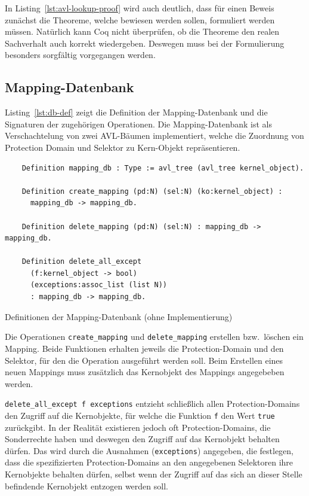 \documentclass[a4paper, parskip]{scrartcl}
\begin{document}
In Listing~\ref{lst:avl-lookup-proof} wird auch deutlich, dass für einen Beweis zunächst die Theoreme, welche bewiesen werden sollen, formuliert werden müssen.
Natürlich kann Coq nicht überprüfen, ob die Theoreme den realen Sachverhalt auch korrekt wiedergeben.
Deswegen muss bei der Formulierung besonders sorgfältig vorgegangen werden.

\subsection{Mapping-Datenbank}
Listing~\ref{lst:db-def} zeigt die Definition der Mapping-Datenbank und die Signaturen der zugehörigen Operationen. 
Die Mapping-Datenbank ist als Verschachtelung von zwei AVL-Bäumen implementiert, welche die Zuordnung von Protection Domain und Selektor zu Kern-Objekt repräsentieren.
\begin{listing}
  \begin{verbatim}
    Definition mapping_db : Type := avl_tree (avl_tree kernel_object).

    Definition create_mapping (pd:N) (sel:N) (ko:kernel_object) : 
      mapping_db -> mapping_db.

    Definition delete_mapping (pd:N) (sel:N) : mapping_db -> mapping_db.

    Definition delete_all_except
      (f:kernel_object -> bool)
      (exceptions:assoc_list (list N))
      : mapping_db -> mapping_db.
  \end{verbatim}
  \caption{Definitionen der Mapping-Datenbank (ohne Implementierung)}
  \label{lst:db-def}
\end{listing}

Die Operationen \verb|create_mapping| und \verb|delete_mapping| erstellen bzw.\ löschen ein Mapping. Beide Funktionen erhalten jeweils die Protection-Domain und den Selektor, für den die Operation ausgeführt werden soll. Beim Erstellen eines neuen Mappings muss zusätzlich das Kernobjekt des Mappings angegebeben werden. 

\verb|delete_all_except f exceptions| entzieht schließlich allen Protection-Domains den Zugriff auf die Kernobjekte, für welche die Funktion \verb|f| den Wert \verb|true| zurückgibt.
In der Realität existieren jedoch oft Protection-Domains, die Sonderrechte haben und deswegen den Zugriff auf das Kernobjekt behalten dürfen.
Das wird durch die Ausnahmen (\verb|exceptions|) angegeben, die festlegen, dass die spezifizierten Protection-Domains an den angegebenen Selektoren ihre Kernobjekte behalten dürfen, selbst wenn der Zugriff auf das sich an dieser Stelle befindende Kernobjekt entzogen werden soll.
\end{document}

